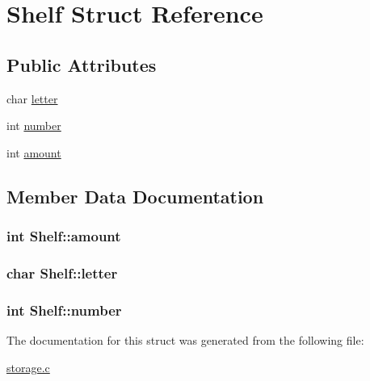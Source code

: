 \hypertarget{structShelf}{\section{Shelf Struct Reference}
\label{structShelf}
}
\subsection*{Public Attributes}
\begin{DoxyCompactItemize}
\item 
char \hyperlink{structShelf_a75aec0f39927a0fc5eed4b3e6e24d280}{letter}
\item 
int \hyperlink{structShelf_a74ed0c277af40a2c3d33a2652dfe471d}{number}
\item 
int \hyperlink{structShelf_a203c48471da60ea7bcab94ebe5f78bf9}{amount}
\end{DoxyCompactItemize}


\subsection{Member Data Documentation}
\hypertarget{structShelf_a203c48471da60ea7bcab94ebe5f78bf9}{
\subsubsection[{amount}]{\setlength{\rightskip}{0pt plus 5cm}int Shelf\-::amount}}\label{structShelf_a203c48471da60ea7bcab94ebe5f78bf9}
\hypertarget{structShelf_a75aec0f39927a0fc5eed4b3e6e24d280}{
\subsubsection[{letter}]{\setlength{\rightskip}{0pt plus 5cm}char Shelf\-::letter}}\label{structShelf_a75aec0f39927a0fc5eed4b3e6e24d280}
\hypertarget{structShelf_a74ed0c277af40a2c3d33a2652dfe471d}{
\subsubsection[{number}]{\setlength{\rightskip}{0pt plus 5cm}int Shelf\-::number}}\label{structShelf_a74ed0c277af40a2c3d33a2652dfe471d}


The documentation for this struct was generated from the following file\-:\begin{DoxyCompactItemize}
\item 
\hyperlink{storage_8c}{storage.\-c}\end{DoxyCompactItemize}

